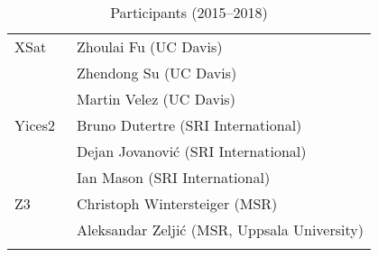 \begin{longtable}{lp{11.5cm}}
  XSat~\cite{DBLP:conf/cav/FuS16}
  & Zhoulai Fu (UC Davis) \\
  & Zhendong Su (UC Davis) \\
  & Martin Velez (UC Davis)
  \\[1ex]

  Yices2~\cite{Dutertre:cav2014}
  & Bruno Dutertre (SRI International) \\
  & Dejan Jovanovi\'c (SRI International) \\
  & Ian Mason (SRI International)
  \\[1ex]

  Z3~\cite{DBLP:conf/tacas/MouraB08}
  & Christoph Wintersteiger (MSR) \\
  & Aleksandar Zelji\'c (MSR, Uppsala University)
  \\
  \bottomrule
\caption{Participants (2015--2018)}
\label{table:participants}
\end{longtable}

